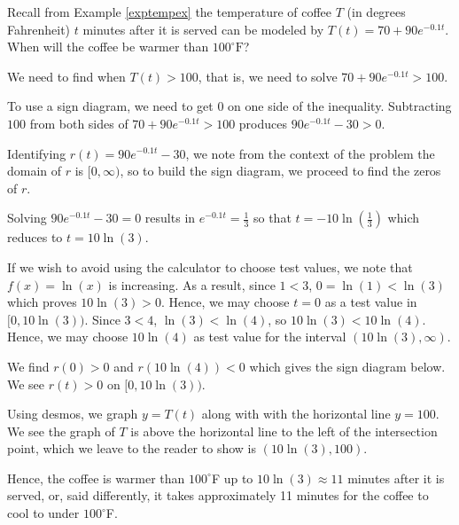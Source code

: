 \documentclass{ximera}
\begin{document}
\begin{example}  \label{coffeewarmerex} Recall from Example \ref{exptempex}  the temperature of coffee $T$ (in degrees Fahrenheit) $t$ minutes after it is served can be modeled by $T(t) = 70 + 90 e^{-0.1 t}$.  When will the coffee be warmer than $100^{\circ}\text{F}$?


\begin{explanation} We need to find when $T(t) > 100$, that is, we need to solve  $70 + 90 e^{-0.1 t} > 100$.  



To use a sign diagram, we need to get $0$ on one side of the inequality.  Subtracting $100$ from both sides of $70 + 90 e^{-0.1 t} > 100$ produces   $90 e^{-0.1 t} - 30 > 0$. 

Identifying  $r(t) = 90 e^{-0.1 t} - 30$, we note from the context of the problem the domain of $r$ is $[0, \infty)$, so to build the sign diagram, we proceed to find the zeros of $r$.  

Solving $90 e^{-0.1 t} - 30=0$ results in $e^{-0.1t} = \frac{1}{3}$ so that $t = -10\ln\left(\frac{1}{3}\right)$  which reduces to $t = 10 \ln(3)$.

If we wish to avoid using the calculator to choose test values, we note that $f(x)  = \ln(x)$ is increasing.  As a result,  since $1 < 3$, $0 = \ln(1) < \ln(3)$ which proves $10\ln(3) > 0$. Hence, we may choose $t = 0$ as a test value in $[0, 10 \ln(3))$.  Since $3 < 4$, $\ln(3) < \ln(4)$, so $10 \ln(3) < 10 \ln(4)$. Hence,  we may choose $10 \ln(4)$   as test value for the interval $(10 \ln(3), \infty)$. 

We find $r(0)>0$ and $r(10\ln(4))<0$  which gives  the sign diagram below. We see $r(t)>0$ on $[0, 10\ln(3))$.


\begin{image}
% 
\end{image}


Using desmos, we graph $y=T(t)$ along with with the horizontal line $y = 100$.   We see the graph of $T$ is above the horizontal line to the left of the intersection point, which we leave to the reader to show is $(10 \ln(3), 100)$.

\begin{center}
\end{center}

Hence, the coffee is warmer than $100^{\circ}$F up to $10 \ln(3) \approx 11$ minutes after it is served, or, said differently, it takes approximately 11 minutes for the coffee to cool to under $100^{\circ}$F.  

\end{explanation}

\end{example}
\end{document}
